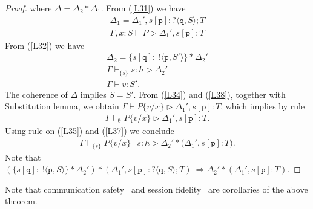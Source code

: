 \documentclass{LMCS}
\newcommand{\ptilde}[1]{{\ensuremath{#1}}}
\newcommand{\si}[2]{\ensuremath{#1[#2]}}
\newcommand{\siq}{\si{\s}{\q}}
\newcommand{\x}{\ensuremath{x}}
\newcommand{\participant}[1]{\ensuremath{\mathtt{#1}}}
\newcommand{\q}{\ensuremath{\participant{q}}}
\newcommand{\p}{\ensuremath{\participant{p}}}
\newcommand{\pc}{\Par}
\newcommand{\s}{\ensuremath{s}}
\newcommand{\values}{\ensuremath{\at{v}}}
\newcommand{\h}{\ensuremath{h}}
\newcommand{\va}{\ensuremath{v}}
\newcommand{\at}[1]{\ensuremath{\ptilde{#1}}}
\newcommand{\atw}[1]{\ensuremath{\ptilde{#1}}}
\newcommand{\Par}{\ensuremath{\ |\ }}
\newcommand{\set}[1]{\ensuremath{\{#1\}}}
\newcommand{\mqueue}[2]{\ensuremath{#1 : #2}}
\newcommand{\queue}{\ensuremath{\h}}
\newcommand{\stdqueue}{\mqueue{\s}{\queue}}
\newcommand{\subst}[2]{\ensuremath{\{#1 / #2\}}}
\newcommand{\Ga}{\ensuremath{\Gamma}}
\newcommand{\D}{\ensuremath{\Delta}}
\newcommand{\T}{\ensuremath{T}}
\newcommand{\ST}{\ensuremath{S}}
\newcommand{\SST}{\atw{S}}
\newcommand{\oT}[2]{\ensuremath{\;!\langle #2,#1\rangle}}
\newcommand{\iT}[2]{\ensuremath{? \langle #2,#1 \rangle}}
\newcommand{\de}[3]{\ensuremath{#1\vdash#2:#3}}
\newcommand{\der}[3]{\ensuremath{#1\vdash#2\triangleright#3}}
\newcommand{\trule}[1]{\text{\footnotesize{\ensuremath{\lfloor\text{\sc{#1}}\rfloor}}}}
\newcommand{\derqq}[4]{\ensuremath{#1 \vdash_{#2} #3 \triangleright #4}}
\newcommand{\derq}[3]{\ensuremath{#1 \vdash_{\set\s} #2 \triangleright #3}}
\newcommand{\Dcomp}{\ensuremath{\ast}}
\newcommand{\PP}{\ensuremath{P}}
\begin{document}
\begin{proof}
where $\D=\D_2\Dcomp\D_1$. From (\ref{L31}) we have
\begin{eqnarray}
\nonumber \D_1=\D_1',\si\s\p:\iT{\ptilde{\ST}}\q;\T\label{L33}\\
\der{\Ga,\ptilde{\x}:\ptilde{\ST}}\PP{\D_1',\si{\s}{\p}:\T}\label{L34}
\end{eqnarray}
From (\ref{L32}) we have
\begin{eqnarray}
\nonumber \D_2=\set{\siq :\oT{\SST'}{\p}}\Dcomp
 \D_2'\label{L36}\\
\derq{\Ga}{\stdqueue}{\D_2'}\label{L37}\\
 \de{\Ga}{\values}{\SST'}.\label{L38}
\end{eqnarray}
The coherence of $\D$ implies $\SST=\SST'$.
From (\ref{L34}) and (\ref{L38}), together with Substitution lemma, we obtain
$\der{\Ga}{\PP\subst{\ptilde{\va}}{\ptilde{\x}}}{\D_1',\si{\s}{\p}:\T}$, which implies by rule \trule{GInit}
\begin{eqnarray}
\derqq{\Ga}{\emptyset}{\PP\subst{\ptilde{\va}}{\ptilde{\x}}}{\D_1',\si{\s}{\p}:\T}.\label{L35}
\end{eqnarray}
Using rule \trule{GPar} on (\ref{L35}) and (\ref{L37}) we conclude
\begin{eqnarray*}
\derqq{\Ga}{\{\s\}}{\PP\subst{\ptilde{\va}}{\ptilde{\x}}\pc
\s:\h}{
 \D_2'\Dcomp(\D_1',\si{s}{\p}:\T}).\end
{eqnarray*}
Note that
${(\set{\siq :\oT{\SST}{\p}}\Dcomp
 \D_2')\Dcomp(\D_1',\s [\p]:\iT{\ptilde{\ST}}\q;\T)}~\Rightarrow{
 \D_2'\Dcomp(\D_1',\si{\s}{\p}:\T)}.$ 






\end{proof}
\noindent 
Note that communication safety~\cite[Theorem 5.5]{CHY07}
and session fidelity~\cite[Corollary 5.6]{CHY07} 
are corollaries of the above theorem.  
\end{document}

